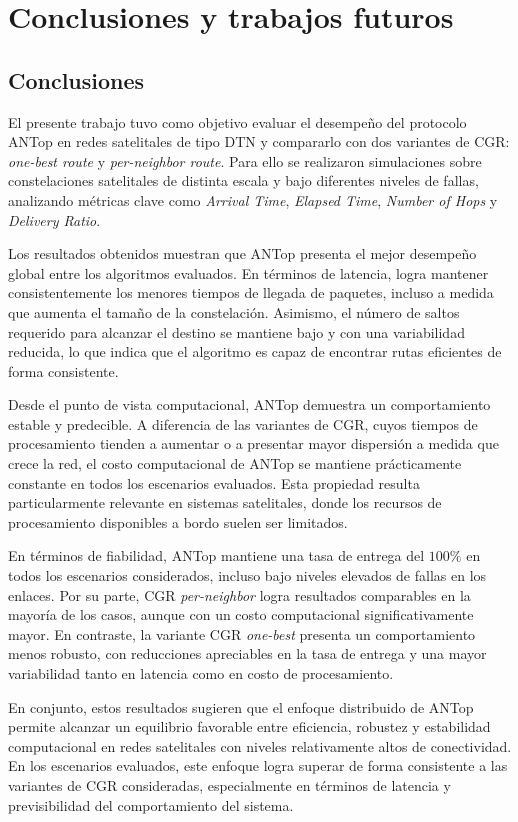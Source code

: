 \chapter{Conclusiones y trabajos futuros}
\section{Conclusiones}

El presente trabajo tuvo como objetivo evaluar el desempeño del protocolo ANTop en redes satelitales de tipo DTN y compararlo con dos variantes de CGR: \textit{one-best route} y \textit{per-neighbor route}. Para ello se realizaron simulaciones sobre constelaciones satelitales de distinta escala y bajo diferentes niveles de fallas, analizando métricas clave como \textit{Arrival Time}, \textit{Elapsed Time}, \textit{Number of Hops} y \textit{Delivery Ratio}.

Los resultados obtenidos muestran que ANTop presenta el mejor desempeño global entre los algoritmos evaluados. En términos de latencia, logra mantener consistentemente los menores tiempos de llegada de paquetes, incluso a medida que aumenta el tamaño de la constelación. Asimismo, el número de saltos requerido para alcanzar el destino se mantiene bajo y con una variabilidad reducida, lo que indica que el algoritmo es capaz de encontrar rutas eficientes de forma consistente.

Desde el punto de vista computacional, ANTop demuestra un comportamiento estable y predecible. A diferencia de las variantes de CGR, cuyos tiempos de procesamiento tienden a aumentar o a presentar mayor dispersión a medida que crece la red, el costo computacional de ANTop se mantiene prácticamente constante en todos los escenarios evaluados. Esta propiedad resulta particularmente relevante en sistemas satelitales, donde los recursos de procesamiento disponibles a bordo suelen ser limitados.

En términos de fiabilidad, ANTop mantiene una tasa de entrega del $100\%$ en todos los escenarios considerados, incluso bajo niveles elevados de fallas en los enlaces. Por su parte, CGR \textit{per-neighbor} logra resultados comparables en la mayoría de los casos, aunque con un costo computacional significativamente mayor. En contraste, la variante CGR \textit{one-best} presenta un comportamiento menos robusto, con reducciones apreciables en la tasa de entrega y una mayor variabilidad tanto en latencia como en costo de procesamiento.

En conjunto, estos resultados sugieren que el enfoque distribuido de ANTop permite alcanzar un equilibrio favorable entre eficiencia, robustez y estabilidad computacional en redes satelitales con niveles relativamente altos de conectividad. En los escenarios evaluados, este enfoque logra superar de forma consistente a las variantes de CGR consideradas, especialmente en términos de latencia y previsibilidad del comportamiento del sistema.

